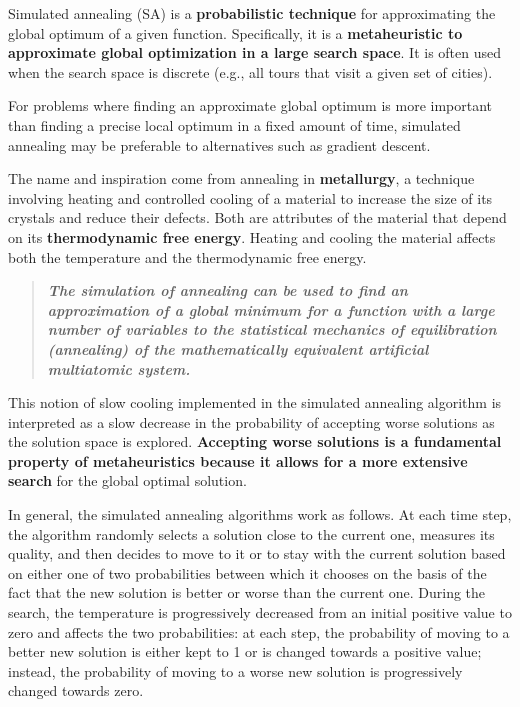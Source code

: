 \documentclass[11pt]{article}
\begin{document}
Simulated annealing (SA) is a \textbf{probabilistic technique} for
approximating the global optimum of a given function. Specifically, it
is a \textbf{metaheuristic to approximate global optimization in a large
search space}. It is often used when the search space is discrete (e.g.,
all tours that visit a given set of cities).

For problems where finding an approximate global optimum is more
important than finding a precise local optimum in a fixed amount of
time, simulated annealing may be preferable to alternatives such as
gradient descent.

The name and inspiration come from annealing in \textbf{metallurgy}, a
technique involving heating and controlled cooling of a material to
increase the size of its crystals and reduce their defects. Both are
attributes of the material that depend on its \textbf{thermodynamic free
energy}. Heating and cooling the material affects both the temperature
and the thermodynamic free energy.

\begin{quote}
\textbf{\emph{The simulation of annealing can be used to find an
approximation of a global minimum for a function with a large number of
variables to the statistical mechanics of equilibration (annealing) of
the mathematically equivalent artificial multiatomic system.}}
\end{quote}

This notion of slow cooling implemented in the simulated annealing
algorithm is interpreted as a slow decrease in the probability of
accepting worse solutions as the solution space is explored.
\textbf{Accepting worse solutions is a fundamental property of
metaheuristics because it allows for a more extensive search} for the
global optimal solution.

In general, the simulated annealing algorithms work as follows. At each
time step, the algorithm randomly selects a solution close to the
current one, measures its quality, and then decides to move to it or to
stay with the current solution based on either one of two probabilities
between which it chooses on the basis of the fact that the new solution
is better or worse than the current one. During the search, the
temperature is progressively decreased from an initial positive value to
zero and affects the two probabilities: at each step, the probability of
moving to a better new solution is either kept to 1 or is changed
towards a positive value; instead, the probability of moving to a worse
new solution is progressively changed towards zero.
\end{document}
